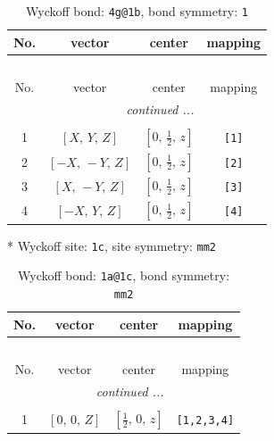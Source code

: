 \documentclass[fleqn,8pt]{jsarticle}
\begin{document}
\begin{longtable}{cccc}
\caption{Wyckoff bond: {\tt 4g@1b}, bond symmetry: {\tt 1}}
 \\
 \hline \hline
No. & vector & center & mapping \\ \hline \endfirsthead

\multicolumn{3}{l}{\tablename\ \thetable{}} \\
 \hline \hline
No. & vector & center & mapping \\ \hline \endhead

 \hline \hline
\multicolumn{3}{r}{\footnotesize\it continued ...} \\ \endfoot

 \hline \hline
\multicolumn{3}{r}{} \\ \endlastfoot

1 & $\left[ X,\, Y,\, Z \right]$ & $\left[ 0,\, \frac{1}{2},\, z \right]$ & {\tt [1]} \\ \hline
2 & $\left[ - X,\, - Y,\, Z \right]$ & $\left[ 0,\, \frac{1}{2},\, z \right]$ & {\tt [2]} \\ \hline
3 & $\left[ X,\, - Y,\, Z \right]$ & $\left[ 0,\, \frac{1}{2},\, z \right]$ & {\tt [3]} \\ \hline
4 & $\left[ - X,\, Y,\, Z \right]$ & $\left[ 0,\, \frac{1}{2},\, z \right]$ & {\tt [4]} \\
\end{longtable}
* Wyckoff site: {\tt 1c}, site symmetry: {\tt mm2}
\renewcommand{\arraystretch}{1.2}
\begin{longtable}{cccc}
\caption{Wyckoff bond: {\tt 1a@1c}, bond symmetry: {\tt mm2}}
 \\
 \hline \hline
No. & vector & center & mapping \\ \hline \endfirsthead

\multicolumn{3}{l}{\tablename\ \thetable{}} \\
 \hline \hline
No. & vector & center & mapping \\ \hline \endhead

 \hline \hline
\multicolumn{3}{r}{\footnotesize\it continued ...} \\ \endfoot

 \hline \hline
\multicolumn{3}{r}{} \\ \endlastfoot

1 & $\left[ 0,\, 0,\, Z \right]$ & $\left[ \frac{1}{2},\, 0,\, z \right]$ & {\tt [1,2,3,4]} \\
\end{longtable}
\renewcommand{\arraystretch}{1.2}
\end{document}
